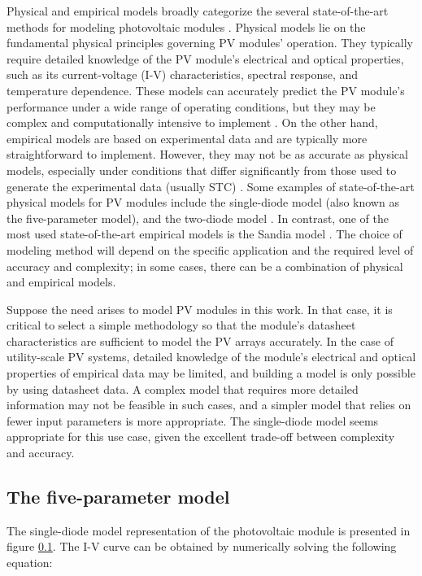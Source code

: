 Physical and empirical models broadly categorize the several state-of-the-art methods for modeling photovoltaic modules \cite{Braun2011}. Physical models lie on the fundamental physical principles governing PV modules' operation. They typically require detailed knowledge of the PV module's electrical and optical properties, such as its current-voltage (I-V) characteristics, spectral response, and temperature dependence. These models can accurately predict the PV module's performance under a wide range of operating conditions, but they may be complex and computationally intensive to implement \cite{Kumar2019}. On the other hand, empirical models are based on experimental data and are typically more straightforward to implement. However, they may not be as accurate as physical models, especially under conditions that differ significantly from those used to generate the experimental data (usually STC) \cite{Braun2011}. Some examples of state-of-the-art physical models for PV modules include the single-diode model (also known as the five-parameter model), and the two-diode model \cite{Godina2017}. In contrast, one of the most used state-of-the-art empirical models is the Sandia model \cite{Braun2011}. The choice of modeling method will depend on the specific application and the required level of accuracy and complexity; in some cases, there can be a combination of physical and empirical models.

Suppose the need arises to model PV modules in this work. In that case, it is critical to select a simple methodology so that the module's datasheet characteristics are sufficient to model the PV arrays accurately. In the case of utility-scale PV systems, detailed knowledge of the module's electrical and optical properties of empirical data may be limited, and building a model is only possible by using datasheet data. A complex model that requires more detailed information may not be feasible in such cases, and a simpler model that relies on fewer input parameters is more appropriate. The single-diode model seems appropriate for this use case, given the excellent trade-off between complexity and accuracy.

\subsection{The five-parameter model}

The single-diode model representation of the photovoltaic module is presented in figure \ref{}. The I-V curve can be obtained by numerically solving the following equation:


